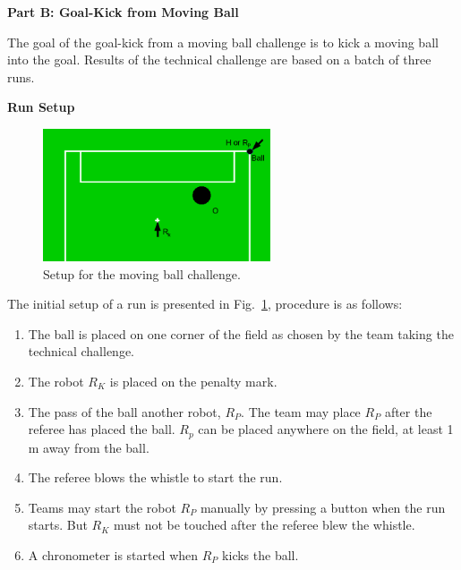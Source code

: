 \clearpage
\sffamily
{\bfseries\color[rgb]{0.4,0.4,0.4}
Part B: Goal-Kick from Moving Ball}
{}


\bigskip

The goal of the goal-kick from a moving ball challenge is to kick a moving ball
into the goal. Results of the technical challenge are based on a batch of three runs.

\bigskip

{\bfseries Run Setup}

\smallskip

\begin{figure}[h]
\begin{center}
\includegraphics[width=0.6\textwidth]{img/tc_dynamic_kick.png}
\caption{\label{fig:tc_dynamic_kick}Setup for the moving ball challenge.}
\end{center}
\end{figure}

The initial setup of a run is presented in Fig.~\ref{fig:tc_dynamic_kick},
procedure is as follows:


\begin{enumerate}
\item The ball is placed on one corner of the field as chosen by the team taking the
technical challenge.
\item The robot $R_K$ is placed on the penalty mark.
\item The pass of the ball
   another robot, $R_P$.
  The team may place $R_P$ after the referee has placed the ball.
  $R_p$ can be placed anywhere on the field, at least 1 m away from the ball.
\item The referee blows the whistle to start the run.
\item Teams may start the robot $R_P$ manually by pressing a button when the
  run starts.
  But $R_K$ must not be touched after the referee blew the whistle.
\item A chronometer is started when $R_P$  kicks the ball.
\end{enumerate}

